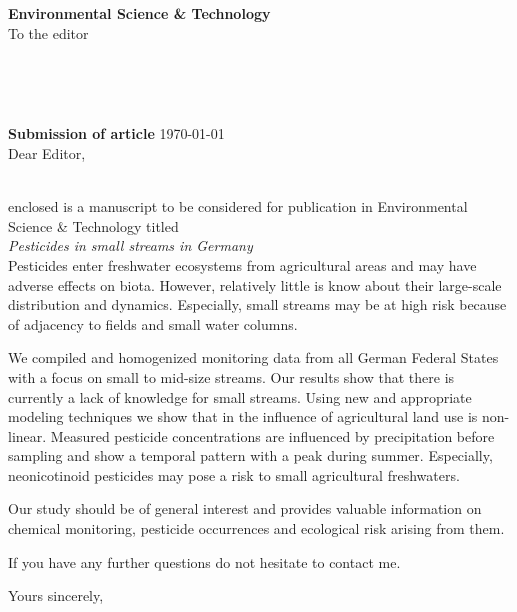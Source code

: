 \documentclass[11pt,a4paper]{letter} %
\def\opening#1{
\thispagestyle{empty}
{\centering\fromaddress \vspace{0.5in} \\} 
{\raggedright \toname \\ \toaddress \par} %
\vspace{2em}
\noindent
\textbf{Submission of article} \hspace*{\fill}\today \\[2em]
\vspace{0.6in} %
\noindent #1 %
}
\begin{document}

\begin{letter}
{
\textbf{Environmental Science \& Technology} \\
\vspace{1em}
To the editor
}

\setlength\parindent{0pt}




\opening{Dear Editor,}
\vspace{-1em}\\
enclosed is a manuscript to be considered for publication in Environmental Science \& Technology titled \\

\emph{Pesticides in small streams in Germany}\\

Pesticides enter freshwater ecosystems from agricultural areas and may have adverse effects on biota.
However, relatively little is know about their large-scale distribution and dynamics.
Especially, small streams may be at high risk because of adjacency to fields and small water columns. 

We compiled and homogenized monitoring data from all German Federal States with a focus on small to mid-size streams. 
Our results show that there is currently a lack of knowledge for small streams. 
Using new and appropriate modeling techniques we show that in the influence of agricultural land use is non-linear.
Measured pesticide concentrations are influenced by precipitation before sampling and show a temporal pattern with a peak during summer.
Especially, neonicotinoid pesticides may pose a risk to small agricultural freshwaters.

Our study should be of general interest and provides valuable information on chemical monitoring, pesticide occurrences and ecological risk arising from them.


If you have any further questions do not hesitate to contact me.

\closing{Yours sincerely, }


\end{letter}
\end{document}
